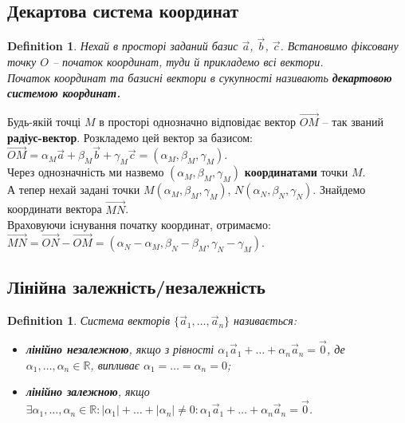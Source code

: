\documentclass[a4paper, 10pt]{extarticle}
\theoremstyle{theoremdd}
\theoremstyle{theoremdd}
\newtheorem{definition}[theorem]{Definition}
\theoremstyle{theoremdd}
\theoremstyle{theoremdd}
\theoremstyle{theoremdd}
\theoremstyle{theoremdd}
\theoremstyle{theoremdd}
\theoremstyle{theoremdd}
\begin{document}
\subsection{Декартова система координат}
\begin{definition}
Нехай в просторі заданий базис $\vec{a}$, $\vec{b}$, $\vec{c}$. Встановимо фіксовану точку $O$ -- початок координат, туди й прикладемо всі вектори.\\
Початок координат та базисні вектори в сукупності називають \textbf{декартовою системою координат.}
\begin{figure}[H]
\centering
\end{figure}
\end{definition}
Будь-якій точці $M$ в просторі однозначно відповідає вектор $\overrightarrow{OM}$ -- так званий \textbf{радіус-вектор}. Розкладемо цей вектор за базисом:\\
	$\overrightarrow{OM} = \alpha_M \vec{a} + \beta_M \vec{b} + \gamma_M \vec{c} = (\alpha_M, \beta_M, \gamma_M)$.\\
	Через однозначність ми назвемо $(\alpha_M, \beta_M, \gamma_M)$ \textbf{координатами} точки $M$.
	\bigskip \\
	А тепер нехай задані точки $M(\alpha_M, \beta_M, \gamma_M)$, $N(\alpha_N, \beta_N, \gamma_N)$. Знайдемо координати вектора $\overrightarrow{MN}$.\\
	Враховуючи існування початку координат, отримаємо:\\
	$\overrightarrow{MN} = \overrightarrow{ON} - \overrightarrow{OM} = (\alpha_N - \alpha_M, \beta_N - \beta_M, \gamma_N - \gamma_M)$.
	
	
\subsection{Лінійна залежність/незалежність}
\begin{definition}
Система векторів $\{\vec{a}_1, \dots, \vec{a}_n\}$ називається:
\begin{itemize}[nosep,wide=0pt]
	\item \textbf{лінійно незалежною}, якщо з рівності $\alpha_1 \vec{a}_1 + \dots + \alpha_n \vec{a}_n = \vec{0}$, де $\alpha_1, \dots, \alpha_n \in \mathbb{R}$, випливає $\alpha_1 = \dots = \alpha_n = 0$;
	\item \textbf{лінійно залежною}, якщо $\exists \alpha_1, \dots, \alpha_n \in \mathbb{R}: |\alpha_1| + \dots + |\alpha_n| \neq 0: \alpha_1 \vec{a}_1 + \dots + \alpha_n \vec{a}_n = \vec{0}$.
\end{itemize}
\end{definition}
\end{document}
